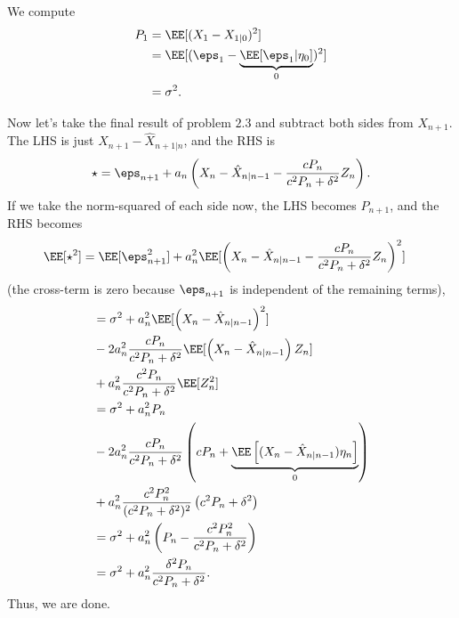 \documentclass{scrartcl}
\begin{document}
We compute
\begin{align*}
    P_1 &= \EE[(X_1 - X_{1|0})^2]\\
    &= \EE[(\eps_1 -\underbrace{\EE[\eps_1|\eta_0]}_0)^2]\\
    &= \sigma^2.
\end{align*}

Now let's take the final result of problem $2.3$ and subtract both sides from $X_{n+1}$. The LHS is just $X_{n+1} - \hat{X}_{n+1|n}$, and the RHS is
\[
    \star = \eps_{n+1} + a_n\left(X_n - \hat{X}_{n|n-1} - \frac{cP_n}{c^2P_n + \delta^2}Z_n\right).
\]
If we take the norm-squared of each side now, the LHS becomes $P_{n+1}$, and the RHS becomes
\begin{align*}
    \EE[\star^2] &= \EE[\eps_{n+1}^2] + a_n^2\EE[\left(X_n - \hat{X}_{n|n-1} - \frac{cP_n}{c^2P_n + \delta^2}Z_n\right)^2]
\end{align*}
(the cross-term is zero because $\eps_{n+1}$ is independent of the remaining terms),
\begin{align*}
    &=\sigma^2 + a_n^2\EE[\left(X_n - \hat{X}_{n|n-1}\right)^2]\\
    &- 2a_n^2\frac{cP_n}{c^2P_n + \delta^2}\EE[\left(X_n - \hat{X}_{n|n-1}\right)Z_n]\\
    &+ a_n^2\frac{c^2P_n}{c^2P_n + \delta^2}\EE[Z_n^2]\\
    &= \sigma^2 + a_n^2P_n\\
    &-2a_n^2\frac{cP_n}{c^2P_n + \delta^2}\left(cP_n +\underbrace{\EE\left[(X_n - \hat{X}_{n|n-1})\eta_n\right]}_0\right)\\
    &+ a_n^2\frac{c^2P^2_n}{(c^2P_n + \delta^2)^2}\left(c^2P_n + \delta^2\right)\\
    &= \sigma^2 + a_n^2\left(P_n - \frac{c^2P_n^2}{c^2P_n + \delta^2}\right)\\
    &= \sigma^2 + a_n^2\frac{\delta^2P_n}{c^2P_n + \delta^2}.
\end{align*}
Thus, we are done.

\end{document}
